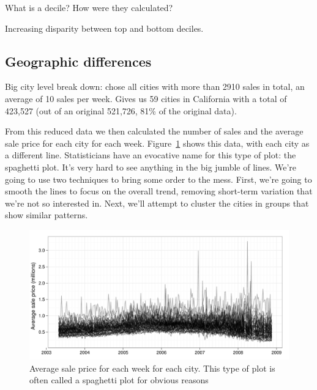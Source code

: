 \documentclass[oneside]{article}
\begin{document}
What is a decile?  How were they calculated?

Increasing disparity between top and bottom deciles.

% 

\subsection{Geographic differences}

Big city level break down: chose all cities with more than 2910 sales in total, an average of 10 sales per week.  Gives us 59 cities in California with a total of 423,527 (out of an original 521,726, 81\% of the original data).  

% 

From this reduced data we then calculated the number of sales and the average sale price for each city for each week.  Figure~\ref{fig:spaghetti} shows this data, with each city as a different line.  Statisticians have an evocative name for this type of plot: the spaghetti plot.  It's very hard to see anything in the big jumble of lines.  We're going to use two techniques to bring some order to the mess.  First, we're going to smooth the lines to focus on the overall trend, removing short-term variation that we're not so interested in.  Next, we'll attempt to cluster the cities in groups that show similar patterns.

\begin{figure}[htbp]
  \centering
    \includegraphics[width=\linewidth]{cities-price}
  \caption{Average sale price for each week for each city.  This type of plot is often called a spaghetti plot for obvious reasons}
  \label{fig:spaghetti}
\end{figure}
\end{document}
